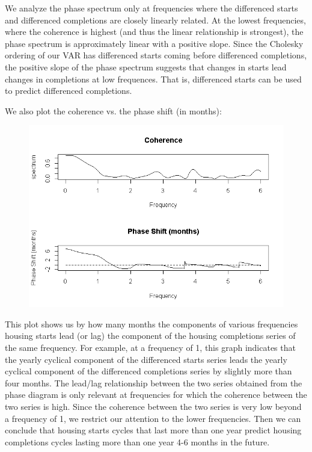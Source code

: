 \documentclass[12pt]{article} %
\begin{document}
We analyze the phase spectrum only at frequencies where the differenced starts and differenced completions are closely linearly related. At the lowest frequencies, where the coherence is highest (and thus the linear relationship is strongest), the phase spectrum is approximately linear with a positive slope. Since the Cholesky ordering of our VAR has differenced starts coming before differenced completions, the positive slope of the phase spectrum suggests that changes in starts lead changes in completions at low frequences. That is, differenced starts can be used to predict differenced completions. 

We also plot the coherence vs. the phase shift (in months):

\begin{figure}[H]
\begin{center}
\includegraphics[scale=0.55]{coherence_phase_shift}
\caption{}
\end{center}
\end{figure}

This plot shows us by how many months the components of various frequencies housing starts lead (or lag) the component of the housing completions series of the same frequency. For example, at a frequency of 1, this graph indicates that the yearly cyclical component of the differenced starts series leads the yearly cyclical component of the differenced completions series by slightly more than four months. The lead/lag relationship between the two series obtained from the phase diagram is only relevant at frequencies for which the coherence between the two series is high. Since the coherence between the two series is very low beyond a frequency of 1, we restrict our attention to the lower frequencies. Then we can conclude that housing starts cycles that last more than one year predict housing completions cycles lasting more than one year 4-6 months in the future.



\label{Bibliography}

 


\end{document}
